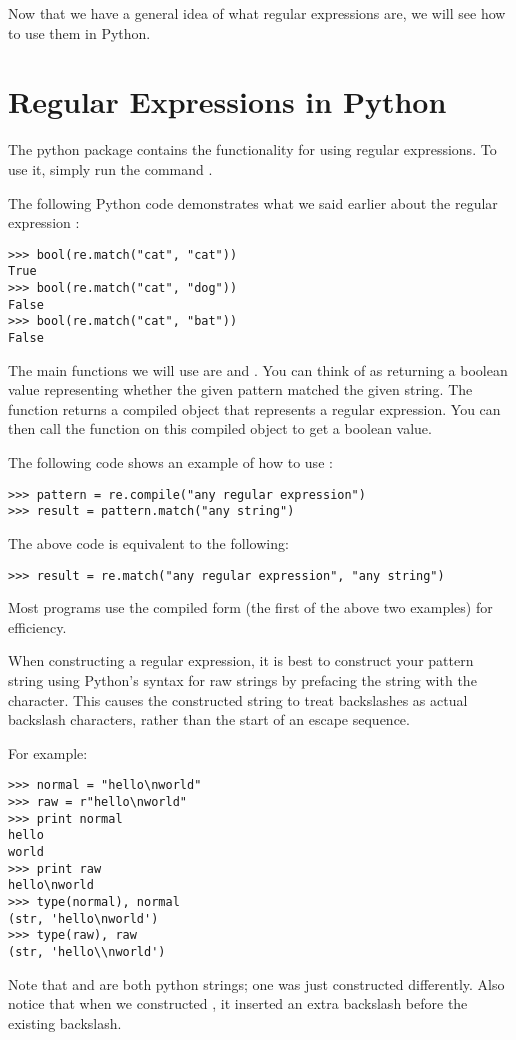 Now that we have a general idea of what regular expressions are, we will see how to use them in Python.

\section*{Regular Expressions in Python}
The python package  contains the functionality for using regular expressions.
To use it, simply run the command .

The following Python code demonstrates what we said earlier about the regular expression :
\begin{lstlisting}
>>> bool(re.match("cat", "cat"))
True
>>> bool(re.match("cat", "dog"))
False
>>> bool(re.match("cat", "bat"))
False
\end{lstlisting}

The main functions we will use are  and .
You can think of  as returning a boolean value representing whether the given pattern matched the given string.
The function  returns a compiled object that represents a regular expression. You can then call the  function on this compiled object to get a boolean value.

The following code shows an example of how to use :
\begin{lstlisting}
>>> pattern = re.compile("any regular expression")
>>> result = pattern.match("any string")
\end{lstlisting}
The above code is equivalent to the following:
\begin{lstlisting}
>>> result = re.match("any regular expression", "any string")
\end{lstlisting}
Most programs use the compiled form (the first of the above two examples) for efficiency.

When constructing a regular expression, it is best to construct your pattern string using Python's syntax for raw strings by prefacing the string with the  character. This causes the constructed string to treat backslashes as actual backslash characters, rather than the start of an escape sequence.

For example:
\begin{lstlisting}
>>> normal = "hello\nworld"
>>> raw = r"hello\nworld"
>>> print normal
hello
world
>>> print raw
hello\nworld
>>> type(normal), normal
(str, 'hello\nworld')
>>> type(raw), raw
(str, 'hello\\nworld')
\end{lstlisting}
Note that  and  are both python strings; one was just constructed differently. Also notice that when we constructed , it inserted an extra backslash before the existing backslash.

